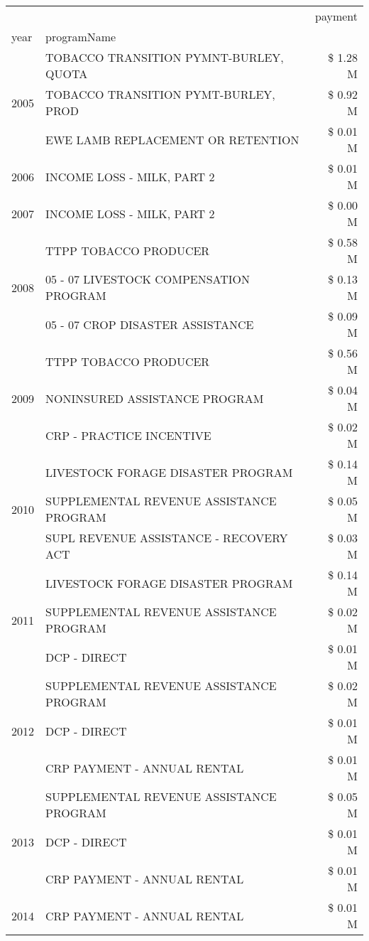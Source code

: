 \begin{tabular}{llr}
\toprule
 &  & payment \\
year & programName &  \\
\midrule
\multirow[t]{3}{*}{2005} & TOBACCO TRANSITION PYMNT-BURLEY, QUOTA & \$ 1.28 M \\
 & TOBACCO TRANSITION PYMT-BURLEY, PROD & \$ 0.92 M \\
 & EWE LAMB REPLACEMENT OR RETENTION & \$ 0.01 M \\
\cline{1-3}
2006 & INCOME LOSS - MILK, PART 2 & \$ 0.01 M \\
\cline{1-3}
2007 & INCOME LOSS - MILK, PART 2 & \$ 0.00 M \\
\cline{1-3}
\multirow[t]{3}{*}{2008} & TTPP TOBACCO PRODUCER & \$ 0.58 M \\
 & 05 - 07 LIVESTOCK COMPENSATION PROGRAM & \$ 0.13 M \\
 & 05 - 07 CROP DISASTER ASSISTANCE & \$ 0.09 M \\
\cline{1-3}
\multirow[t]{3}{*}{2009} & TTPP TOBACCO PRODUCER & \$ 0.56 M \\
 & NONINSURED ASSISTANCE PROGRAM & \$ 0.04 M \\
 & CRP - PRACTICE INCENTIVE & \$ 0.02 M \\
\cline{1-3}
\multirow[t]{3}{*}{2010} & LIVESTOCK FORAGE DISASTER PROGRAM & \$ 0.14 M \\
 & SUPPLEMENTAL REVENUE ASSISTANCE PROGRAM & \$ 0.05 M \\
 & SUPL REVENUE ASSISTANCE - RECOVERY ACT & \$ 0.03 M \\
\cline{1-3}
\multirow[t]{3}{*}{2011} & LIVESTOCK FORAGE DISASTER PROGRAM & \$ 0.14 M \\
 & SUPPLEMENTAL REVENUE ASSISTANCE PROGRAM & \$ 0.02 M \\
 & DCP - DIRECT & \$ 0.01 M \\
\cline{1-3}
\multirow[t]{3}{*}{2012} & SUPPLEMENTAL REVENUE ASSISTANCE PROGRAM & \$ 0.02 M \\
 & DCP - DIRECT & \$ 0.01 M \\
 & CRP PAYMENT - ANNUAL RENTAL & \$ 0.01 M \\
\cline{1-3}
\multirow[t]{3}{*}{2013} & SUPPLEMENTAL REVENUE ASSISTANCE PROGRAM & \$ 0.05 M \\
 & DCP - DIRECT & \$ 0.01 M \\
 & CRP PAYMENT - ANNUAL RENTAL & \$ 0.01 M \\
\cline{1-3}
\multirow[t]{3}{*}{2014} & CRP PAYMENT - ANNUAL RENTAL & \$ 0.01 M \\

\end{tabular}
